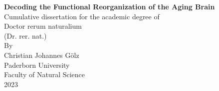 \begin{titlepage}
    \begin{center}
        \vspace*{2cm}
        \LARGE
        \textbf{Decoding the Functional Reorganization of the Aging Brain}\\
        \vspace{2cm}
        \Large 
        Cumulative dissertation for the academic degree of\\
        Doctor rerum naturalium\\
        (Dr. rer. nat.)\\
        By\\
        Christian Johannes Gölz\\
        \vfill
        Paderborn University\\
        Faculty of Natural Science\\
        2023\\
            
    \end{center}
\end{titlepage}

